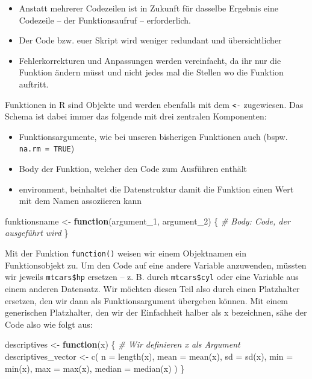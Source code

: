 \documentclass[
]{article}
\newenvironment{Shaded}{\begin{snugshade}}{\end{snugshade}}
\newcommand{\AttributeTok}[1]{\textcolor[rgb]{0.77,0.63,0.00}{#1}}
\newcommand{\CommentTok}[1]{\textcolor[rgb]{0.56,0.35,0.01}{\textit{#1}}}
\newcommand{\ControlFlowTok}[1]{\textcolor[rgb]{0.13,0.29,0.53}{\textbf{#1}}}
\newcommand{\FunctionTok}[1]{\textcolor[rgb]{0.00,0.00,0.00}{#1}}
\newcommand{\NormalTok}[1]{#1}
\newcommand{\OtherTok}[1]{\textcolor[rgb]{0.56,0.35,0.01}{#1}}
\providecommand{\tightlist}{%
  \setlength{\itemsep}{0pt}\setlength{\parskip}{0pt}}
\begin{document}
\begin{itemize}
\tightlist
\item
  Anstatt mehrerer Codezeilen ist in Zukunft für dasselbe Ergebnis eine Codezeile -- der Funktionsaufruf -- erforderlich.
\item
  Der Code bzw. euer Skript wird weniger redundant und übersichtlicher
\item
  Fehlerkorrekturen und Anpassungen werden vereinfacht, da ihr nur die Funktion ändern müsst und nicht jedes mal die Stellen wo die Funktion auftritt.
\end{itemize}

Funktionen in R sind Objekte und werden ebenfalls mit dem \texttt{\textless{}-} zugewiesen. Das Schema ist dabei immer das folgende mit drei zentralen Komponenten:

\begin{itemize}
\tightlist
\item
  Funktionsargumente, wie bei unseren bisherigen Funktionen auch (bspw. \texttt{na.rm\ =\ TRUE})
\item
  Body der Funktion, welcher den Code zum Ausführen enthält
\item
  environment, beinhaltet die Datenstruktur damit die Funktion einen Wert mit dem Namen assoziieren kann
\end{itemize}

\begin{Shaded}
\begin{Highlighting}[]
\NormalTok{funktionsname }\OtherTok{\textless{}{-}} \ControlFlowTok{function}\NormalTok{(argument\_1, argument\_2) \{}
  \CommentTok{\# Body: Code, der ausgeführt wird}
\NormalTok{\}}
\end{Highlighting}
\end{Shaded}

Mit der Funktion \texttt{function()} weisen wir einem Objektnamen ein Funktionsobjekt zu. Um den Code auf eine andere Variable anzuwenden, müssten wir jeweils \texttt{mtcars\$hp} ersetzen -- z. B. durch \texttt{mtcars\$cyl} oder eine Variable aus einem anderen Datensatz. Wir möchten diesen Teil also durch einen Platzhalter ersetzen, den wir dann als Funktionsargument übergeben können. Mit einem generischen Platzhalter, den wir der Einfachheit halber als x bezeichnen, sähe der Code also wie folgt aus:

\begin{Shaded}
\begin{Highlighting}[]
\NormalTok{descriptives }\OtherTok{\textless{}{-}} \ControlFlowTok{function}\NormalTok{(x) \{ }\CommentTok{\# Wir definieren \textquotesingle{}x\textquotesingle{} als Argument}
\NormalTok{  descriptives\_vector }\OtherTok{\textless{}{-}} \FunctionTok{c}\NormalTok{(}
    \AttributeTok{n =} \FunctionTok{length}\NormalTok{(x),}
    \AttributeTok{mean =} \FunctionTok{mean}\NormalTok{(x),}
    \AttributeTok{sd =} \FunctionTok{sd}\NormalTok{(x),}
    \AttributeTok{min =} \FunctionTok{min}\NormalTok{(x),}
    \AttributeTok{max =} \FunctionTok{max}\NormalTok{(x),}
    \AttributeTok{median =} \FunctionTok{median}\NormalTok{(x)}
\NormalTok{  )}
\NormalTok{\}}
\end{Highlighting}
\end{Shaded}
\end{document}
